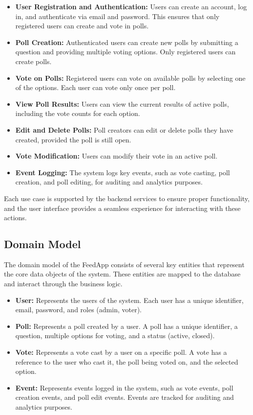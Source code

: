 \begin{itemize}
    \item \textbf{User Registration and Authentication:} Users can create an account, log in, and authenticate via email and password. This ensures that only registered users can create and vote in polls.
    \item \textbf{Poll Creation:} Authenticated users can create new polls by submitting a question and providing multiple voting options. Only registered users can create polls.
    \item \textbf{Vote on Polls:} Registered users can vote on available polls by selecting one of the options. Each user can vote only once per poll.
    \item \textbf{View Poll Results:} Users can view the current results of active polls, including the vote counts for each option.
    \item \textbf{Edit and Delete Polls:} Poll creators can edit or delete polls they have created, provided the poll is still open.
    \item \textbf{Vote Modification:} Users can modify their vote in an active poll.
    \item \textbf{Event Logging:} The system logs key events, such as vote casting, poll creation, and poll editing, for auditing and analytics purposes.
\end{itemize}

Each use case is supported by the backend services to ensure proper functionality, and the user interface provides a seamless experience for interacting with these actions.

\subsection{Domain Model}
The domain model of the FeedApp consists of several key entities that represent the core data objects of the system. These entities are mapped to the database and interact through the business logic.

\begin{itemize}
    \item \textbf{User:} Represents the users of the system. Each user has a unique identifier, email, password, and roles (admin, voter).
    \item \textbf{Poll:} Represents a poll created by a user. A poll has a unique identifier, a question, multiple options for voting, and a status (active, closed).
    \item \textbf{Vote:} Represents a vote cast by a user on a specific poll. A vote has a reference to the user who cast it, the poll being voted on, and the selected option.
    \item \textbf{Event:} Represents events logged in the system, such as vote events, poll creation events, and poll edit events. Events are tracked for auditing and analytics purposes.
\end{itemize}



